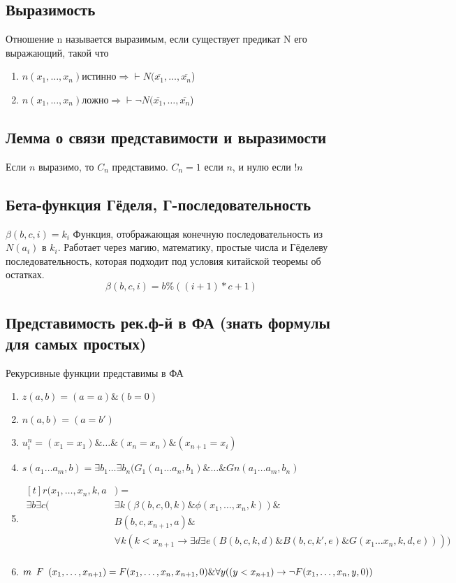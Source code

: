 \subsection{Выразимость}
\label{sec-2-25}
Отношение n называется выразимым, если существует предикат N его
выражающий, такой что
\begin{enumerate}
    \item $n(x_1, \dotsc, x_n) истинно \Rightarrow \vdash N(\overline{x_1}, \dotsc, \overline{x_n}$)
    \item $n(x_1, \dotsc, x_n) ложно \Rightarrow \vdash \lnot N(\overline{x_1}, \dotsc, \overline{x_n}$)
\end{enumerate}
\subsection{Лемма о связи представимости и выразимости}
\label{sec-2-26}
Если $n$ выразимо, то $C_n$ представимо.
$C_n = 1$ если $n$, и нулю если $!n$
\subsection{Бета-функция Гёделя, Г-последовательность}
\label{sec-2-27}
$\beta(b, c, i) = k_i$
Функция, отображающая конечную последовательность из $N (a_i)$ в $k_i$.
Работает через магию, математику, простые числа и Гёделеву
последовательность, которая подходит под условия китайской
теоремы об остатках.
\[\beta(b, c, i) = b \% ((i + 1) * c + 1)\]
\subsection{Представимость рек.ф-й в ФА (знать формулы для самых простых)}
\label{sec-2-28}
Рекурсивные функции представимы в ФА
\begin{enumerate}
\item $z(a, b) = (a = a) \& (b = 0)$
\item $n(a, b) = (a = b')$
\item $u^n_i = (x_1 = x_1) \& \ldots{} \& (x_n = x_n) \& (x_{n+1} = x_i)$
\item $s(a_1\ldots{}a_m, b) = \exists b_1\ldots{}\exists b_n(G_1(a_1\ldots{}a_n, b_1) \& \ldots{} \& Gn(a_1\ldots{}a_m, b_n)$
\item $\begin{aligned}[t]
        r(x_1,\dotsc,x_n, k, a&) =\\
    \exists b\exists c(&\exists k(\beta(b, c, 0, k) \& \phi(x_1, \dotsc, x_n, k)) \&\\
        &B(b, c, x_{n+1}, a)\&\\
        &\forall k(k<x_{n+1} \to \exists d\exists e(B(b,c,k,d)\&B(b,c,k',e)\&G(x_1\ldots{}x_n,k,d,e))))\\
    \end{aligned}$
\item $m\ltemplate F\rtemplate(x_1,\dotsc, x_{n+1}) = F(x_1, \dotsc, x_n, x_{n+1}, 0) \& \forall y((y < x_{n+1}) \to \lnot F(x_1,\dotsc, x_n, y, 0))$
\end{enumerate}
